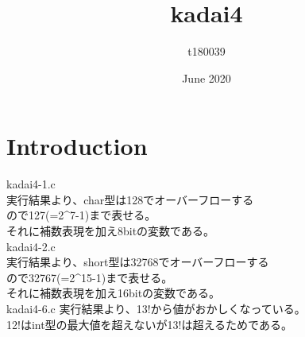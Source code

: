 \documentclass{article}
\title{kadai4}
\author{t180039 }
\date{June 2020}
\begin{document}
\maketitle

\section{Introduction}
kadai4-1.c\\
実行結果より、char型は128でオーバーフローする\\
ので127(=2^7-1)まで表せる。\\
それに補数表現を加え8bitの変数である。\\

kadai4-2.c\\
実行結果より、short型は32768でオーバーフローする\\
ので32767(=2^15-1)まで表せる。\\
それに補数表現を加え16bitの変数である。\\

kadai4-6.c
実行結果より、13!から値がおかしくなっている。\\
12!はint型の最大値を超えないが13!は超えるためである。\\
\end{document}

